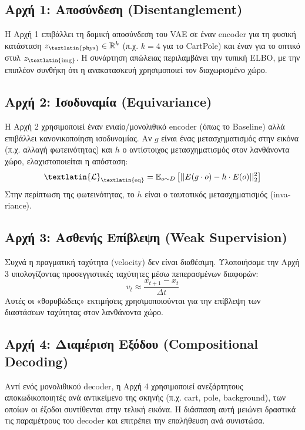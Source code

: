\documentclass[conference, a4paper]{IEEEtran}
\begin{document}
\subsection{\textbf{Αρχή 1: Αποσύνδεση (\textlatin{Disentanglement})}}
Η Αρχή 1 επιβάλλει τη δομική αποσύνδεση του \textlatin{VAE} σε έναν \textlatin{encoder} για τη φυσική κατάσταση $z_{\text{\textlatin{phys}}} \in \mathbb{R}^k$ (π.χ. $k=4$ για το \textlatin{CartPole}) και έναν για το οπτικό στυλ $z_{\text{\textlatin{img}}}$. Η συνάρτηση απώλειας περιλαμβάνει την τυπική \textlatin{ELBO}, με την επιπλέον συνθήκη ότι η ανακατασκευή χρησιμοποιεί τον διαχωρισμένο χώρο.

\subsection{\textbf{Αρχή 2: Ισοδυναμία (\textlatin{Equivariance})}}
Η Αρχή 2 χρησιμοποιεί έναν ενιαίο/μονολιθικό \textlatin{encoder} (όπως το \textlatin{Baseline}) αλλά επιβάλλει κανονικοποίηση ισοδυναμίας. Αν $g$ είναι ένας μετασχηματισμός στην εικόνα (π.χ. αλλαγή φωτεινότητας) και $h$ ο αντίστοιχος μετασχηματισμός στον λανθάνοντα χώρο, ελαχιστοποιείται η απόσταση:
\begin{equation}
    \textlatin{\ensuremath{\mathcal{L}}}_{\text{\textlatin{eq}}} = \mathbb{E}_{o \sim D} \left[ || E(g \cdot o) - h \cdot E(o) ||_2^2 \right]
\end{equation}
Στην περίπτωση της φωτεινότητας, το $h$ είναι ο ταυτοτικός μετασχηματισμός (\textlatin{invariance}).

\subsection{\textbf{Αρχή 3: Ασθενής Επίβλεψη (\textlatin{Weak Supervision})}}
Συχνά η πραγματική ταχύτητα (\textlatin{velocity}) δεν είναι διαθέσιμη. Υλοποιήσαμε την Αρχή 3 υπολογίζοντας προσεγγιστικές ταχύτητες μέσω πεπερασμένων διαφορών:
\begin{equation}
    v_t \approx \frac{x_{t+1} - x_t}{\Delta t}
\end{equation}
Αυτές οι «θορυβώδεις» εκτιμήσεις χρησιμοποιούνται για την επίβλεψη των διαστάσεων ταχύτητας στον λανθάνοντα χώρο.

\subsection{\textbf{Αρχή 4: Διαμέριση Εξόδου (\textlatin{Compositional Decoding})}}
Αντί ενός μονολιθικού \textlatin{decoder}, η Αρχή 4 χρησιμοποιεί ανεξάρτητους αποκωδικοποιητές ανά αντικείμενο της σκηνής (π.χ. \textlatin{cart}, \textlatin{pole}, \textlatin{background}), των οποίων οι έξοδοι συντίθενται στην τελική εικόνα. Η διάσπαση αυτή μειώνει δραστικά τις παραμέτρους του \textlatin{decoder} και επιτρέπει την επαλήθευση ανά συνιστώσα.
\end{document}
